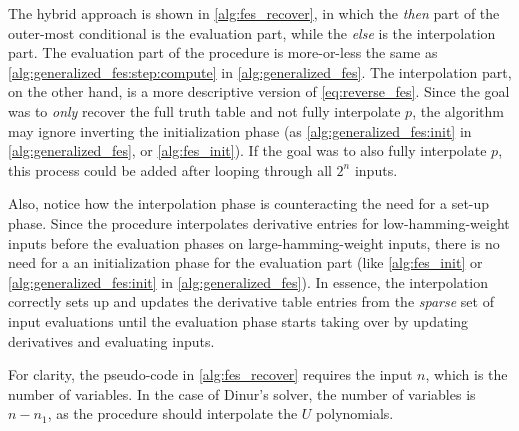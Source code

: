 The hybrid approach is shown in \cref{alg:fes_recover}, in which the \textit{then} part of the outer-most conditional is the evaluation part, while the \textit{else} is the interpolation part. The evaluation part of the procedure is more-or-less the same as \cref{alg:generalized_fes:step:compute} in \cref{alg:generalized_fes}. The interpolation part, on the other hand, is a more descriptive version of \cref{eq:reverse_fes}. Since the goal was to \textit{only} recover the full truth table and not fully interpolate $p$, the algorithm may ignore inverting the initialization phase (as \cref{alg:generalized_fes:init} in \cref{alg:generalized_fes}, or \cref{alg:fes_init}). If the goal was to also fully interpolate $p$, this process could be added after looping through all $2^n$ inputs. 

Also, notice how the interpolation phase is counteracting the need for a set-up phase. Since the procedure interpolates derivative entries for low-hamming-weight inputs before the evaluation phases on large-hamming-weight inputs, there is no need for a an initialization phase for the evaluation part (like \cref{alg:fes_init} or \cref{alg:generalized_fes:init} in \cref{alg:generalized_fes}). In essence, the interpolation correctly sets up and updates the derivative table entries from the \textit{sparse} set of input evaluations until the evaluation phase starts taking over by updating derivatives and evaluating inputs.

For clarity, the pseudo-code in \cref{alg:fes_recover} requires the input $n$, which is the number of variables. In the case of Dinur's solver, the number of variables is $n - n_1$, as the procedure should interpolate the $U$ polynomials.


\newpage

